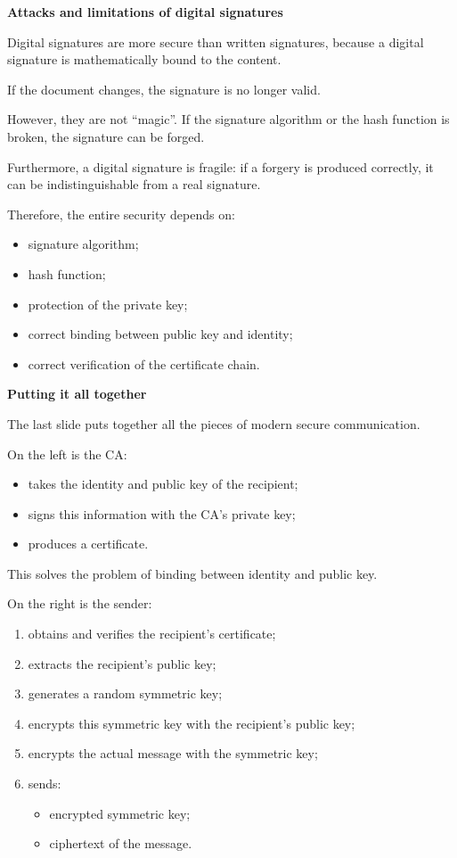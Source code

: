 \documentclass{article}
\begin{document}
\textbf{Attacks and limitations of digital signatures}

Digital signatures are more secure than written signatures, because a digital signature is mathematically bound to the content.

If the document changes, the signature is no longer valid.

However, they are not ``magic''. If the signature algorithm or the hash function is broken, the signature can be forged.

Furthermore, a digital signature is fragile: if a forgery is produced correctly, it can be indistinguishable from a real signature.

Therefore, the entire security depends on:

\begin{itemize}
\item signature algorithm;
\item hash function;
\item protection of the private key;
\item correct binding between public key and identity;
\item correct verification of the certificate chain.
\end{itemize}

\textbf{Putting it all together}

The last slide puts together all the pieces of modern secure communication.

On the left is the CA:

\begin{itemize}
\item takes the identity and public key of the recipient;
\item signs this information with the CA's private key;
\item produces a certificate.
\end{itemize}

This solves the problem of binding between identity and public key.

On the right is the sender:

\begin{enumerate}
\item obtains and verifies the recipient's certificate;
\item extracts the recipient's public key;
\item generates a random symmetric key;
\item encrypts this symmetric key with the recipient's public key;
\item encrypts the actual message with the symmetric key;
\item sends:
\begin{itemize}
\item encrypted symmetric key;
\item ciphertext of the message.
\end{itemize}
\end{enumerate}
\end{document}
